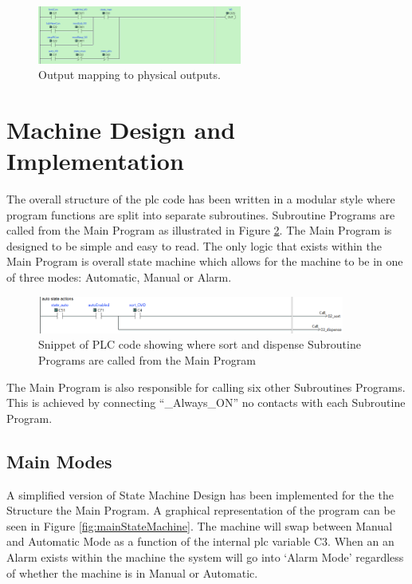         \begin{figure}[H]
            \centering
            \includegraphics[width = 0.6\textwidth]{2_images/outputMapping}
            \caption{Output mapping to physical outputs.}
            \label{fig:outputMapping}
        \end{figure}        

\section{Machine Design and Implementation}
    The overall structure of the \acrshort{plc} code has been written in a modular style where program functions are split into separate subroutines. Subroutine Programs are called from the Main Program as illustrated in Figure \ref{fig:plcMainAuto}. The Main Program is designed to be simple and easy to read. The only logic that exists within the Main Program is overall state machine which allows for the machine to be in one of three modes: Automatic, Manual or Alarm. 

        \begin{figure}[H]
            \centering
            \includegraphics[width = 0.9\textwidth]{2_images/plcMainAuto}
            \caption{Snippet of PLC code showing where sort and dispense Subroutine Programs are called from the Main Program}
            \label{fig:plcMainAuto}
        \end{figure}
    The Main Program is also responsible for calling six other Subroutines Programs. This is achieved by connecting   ``\_Always\_ON'' \acrshort{no} contacts with each Subroutine Program.
    
    \subsection{Main Modes}
    A simplified version of State Machine Design has been implemented for the the Structure the Main Program. A graphical representation of the program can be seen in Figure \ref{fig:mainStateMachine}. The machine will swap between Manual and Automatic Mode as a function of the internal \acrshort{plc} variable C3. When an an Alarm exists within the machine the system will go into `Alarm Mode' regardless of whether the machine is in Manual or Automatic. 
    

